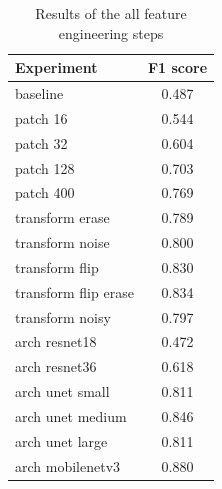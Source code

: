 \begin{table}[h!]
\centering
\begin{tabular}{l|c}
Experiment & F1 score \\ 
\hline
baseline & 0.487 \\
patch 16 & 0.544 \\
patch 32 & 0.604 \\
patch 128 & 0.703 \\
patch 400 & 0.769 \\
transform erase & 0.789 \\
transform noise & 0.800 \\
transform flip & 0.830 \\
transform flip erase & 0.834 \\
transform noisy & 0.797 \\
arch resnet18 & 0.472 \\
arch resnet36 & 0.618 \\
arch unet small & 0.811 \\
arch unet medium & 0.846 \\
arch unet large & 0.811 \\
arch mobilenetv3 & 0.880 \\
\end{tabular}
\vspace{2mm}\caption{Results of the all feature engineering steps}
\label{tab:results}
\end{table}
